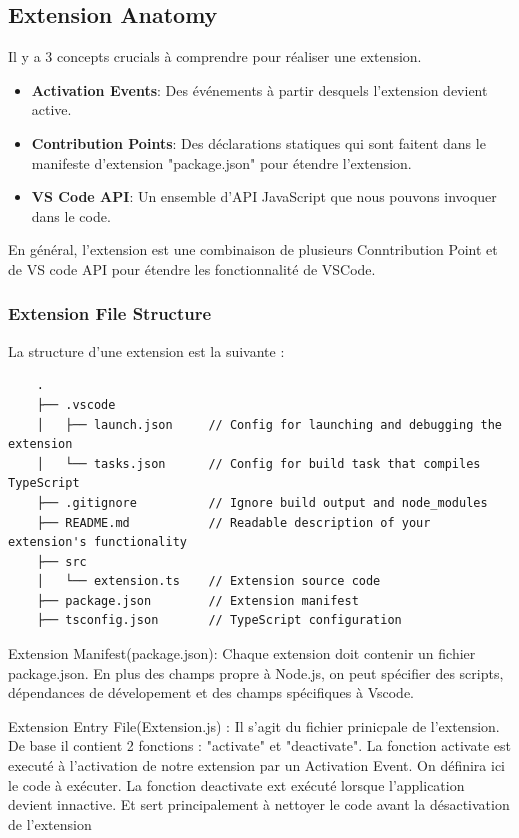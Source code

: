 \documentclass[
    iict, %
    il, %
]{heig-tb}
\begin{document}
\subsection{Extension Anatomy}
Il y a 3 concepts crucials à comprendre pour réaliser une extension.
\begin{itemize}
    \item \textbf{Activation Events}: Des événements à partir desquels l'extension devient active.
    \item \textbf{Contribution Points}: Des déclarations statiques qui sont faitent dans le manifeste d'extension "package.json" pour étendre l'extension.
    \item \textbf{VS Code API}: Un ensemble d'API JavaScript que nous pouvons invoquer dans le code.
\end{itemize}

En général, l'extension est une combinaison de plusieurs Conntribution Point et de VS code API pour étendre les fonctionnalité de VSCode.

\subsubsection{Extension File Structure}
La structure d'une extension est la suivante :
\begin{lstlisting}
    .
    ├── .vscode
    │   ├── launch.json     // Config for launching and debugging the extension
    │   └── tasks.json      // Config for build task that compiles TypeScript
    ├── .gitignore          // Ignore build output and node_modules
    ├── README.md           // Readable description of your extension's functionality
    ├── src
    │   └── extension.ts    // Extension source code
    ├── package.json        // Extension manifest
    ├── tsconfig.json       // TypeScript configuration
\end{lstlisting}

Extension Manifest(package.json):
Chaque extension doit contenir un fichier package.json. En plus des champs propre à Node.js, on peut spécifier des scripts, dépendances de dévelopement et des champs spécifiques à Vscode.

Extension Entry File(Extension.js) :
Il s'agit du fichier prinicpale de l'extension.
De base il contient 2 fonctions : "activate" et "deactivate".
La fonction activate est executé à l'activation de notre extension par un Activation Event. On définira ici le code à exécuter.
La fonction deactivate  ext exécuté lorsque l'application devient innactive. Et sert principalement à nettoyer le code avant la désactivation de l'extension
\end{document}

